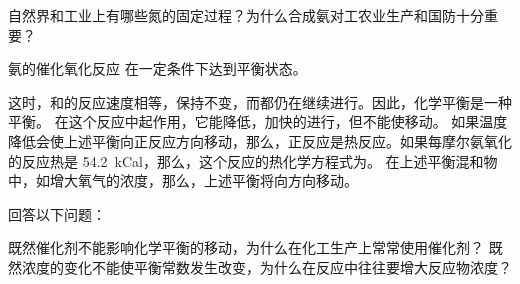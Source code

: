 \begin{Exercise}
\begin{question}
  \item 自然界和工业上有哪些氮的固定过程？为什么合成氨对工农业生产和国防十分重要？
  \item 氨的催化氧化反应  在一定条件下达到平衡状态。
  \begin{tasks}
    \task 这时，和的反应速度相等，保持不变，而都仍在继续进行。因此，化学平衡是一种平衡。
    \task {} 在这个反应中起作用，它能降低，加快的进行，但不能使移动。
    \task 如果温度降低会使上述平衡向正反应方向移动，那么，正反应是热反应。如果每摩尔氨氧化的反应热是 \qty{54.2}{kCal}，那么，这个反应的热化学方程式为\CJKunderline[hidden]{\hspace*{15em}}。
    \task 在上述平衡混和物中，如增大氧气的浓度，那么，上述平衡将向方向移动。
  \end{tasks}
  \item 回答以下问题：
  \begin{tasks}
    \task 既然催化剂不能影响化学平衡的移动，为什么在化工生产上常常使用催化剂？
    \task 既然浓度的变化不能使平衡常数发生改变，为什么在反应中往往要增大反应物浓度？

\end{tasks}
\end{question}
\end{Exercise}
